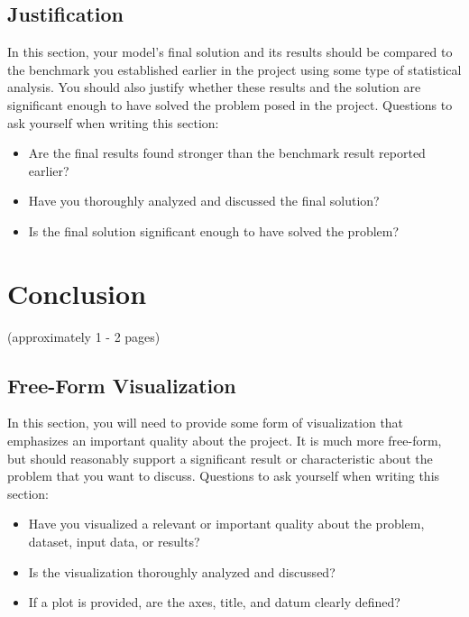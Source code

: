 \documentclass[twoside,openright,titlepage,numbers=noenddot,headinclude,%
               footinclude=true,cleardoublepage=empty,abstractoff,BCOR=5mm,%
               paper=a4,fontsize=11pt,ngerman,american]{scrreprt}
\numberwithin{theorem}{chapter}
\numberwithin{definition}{chapter}
\numberwithin{algorithm}{chapter}
\numberwithin{figure}{chapter}
\numberwithin{table}{chapter}
\numberwithin{equation}{chapter}
\begin{document}
\section*{Justification}
In this section, your model’s final solution and its results should be compared to the benchmark you established earlier in the project using some type of statistical analysis. You should also justify whether these results and the solution are significant enough to have solved the problem posed in the project. Questions to ask yourself when writing this section:
\begin{itemize}%
\item Are the final results found stronger than the benchmark result reported earlier?
\item Have you thoroughly analyzed and discussed the final solution?
\item Is the final solution significant enough to have solved the problem?
\end{itemize}


\chapter*{Conclusion}
(approximately 1 - 2 pages)

\section*{Free-Form Visualization}
In this section, you will need to provide some form of visualization that emphasizes an important quality about the project. It is much more free-form, but should reasonably support a significant result or characteristic about the problem that you want to discuss. Questions to ask yourself when writing this section:
\begin{itemize}%
\item Have you visualized a relevant or important quality about the problem, dataset, input data, or results?
\item Is the visualization thoroughly analyzed and discussed?
\item If a plot is provided, are the axes, title, and datum clearly defined?
\end{itemize}
\end{document}

